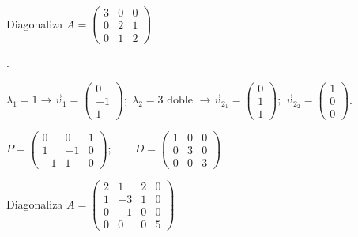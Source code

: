 \begin{ejre}
	Diagonaliza $A=\left(\begin{matrix} 3&0&0\\0&2&1\\0&1&2  \end{matrix}\right)$
\end{ejre}

\begin{proofw}\renewcommand{\qedsymbol}{$\diamond$}.

\noindent \small{$ \lambda_1=1 \longrightarrow \vec v_1=\left( \begin{matrix} 0\\-1\\1 \end{matrix}\right); \; \lambda_2=3 \text { doble } \longrightarrow \vec v_{2_1}=\left( \begin{matrix} 0\\1\\1 \end{matrix}\right); \;\vec v_{2_2}=\left( \begin{matrix} 1\\0\\0 \end{matrix}\right)$}\normalsize{.}

$P=\left(\begin{matrix} 0&0&1\\1&-1&0\\-1&1&0  \end{matrix}\right); \qquad D=\left(\begin{matrix} 1&0&0\\0&3&0\\0&0&3  \end{matrix}\right)$
	
\end{proofw}

\begin{ejre}
	Diagonaliza $A=\left(\begin{matrix} 2&1&2&0\\1&-3&1&0\\0&-1&0&0\\0&0&0&5 \end{matrix}\right)$

\end{ejre}

